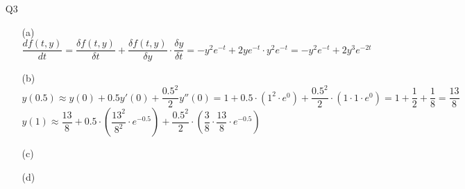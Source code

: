 \documentclass{article}
\begin{document}
\begin{itemize}
\begin{itemize}
\begin{verbatim}
    for h in h_vals:
        print(f"h={h}")
        t, y, steps = t_0, y_0, int((t_f-t_0)/h)
        for _ in range(steps):
            y_prev = y
            y = y_prev + h*(1+t)/(1+y_prev)
            t += h
        print(f"y={y}\n")
                    \end{verbatim}
              \item [(c)] Exact solution: $y(2)=\sqrt{14}-1\approx 2.741657387$; we can see that smaller $h$ values resulted in approximations that are closer to the exact $y(2)$ value as expected.
          \end{itemize}
    \item [Q3]
          \begin{itemize}
              \item [(a)] $\dfrac{df(t,y)}{dt}=\dfrac{\delta f(t,y)}{\delta t}+\dfrac{\delta f(t,y)}{\delta y}\cdot\dfrac{\delta y}{\delta t}=-y^2e^{-t}+2ye^{-t}\cdot y^2e^{-t}=\boxed{-y^2e^{-t}+2y^3e^{-2t}}$
              \item [(b)] $y(0.5)\approx y(0)+0.5y'(0)+\dfrac{0.5^2}{2}y''(0)=1+0.5\cdot(1^2\cdot e^0)+\dfrac{0.5^2}{2}\cdot(1\cdot 1\cdot e^0)=1+\dfrac{1}{2}+\dfrac{1}{8}=\dfrac{13}{8}$\\$y(1)\approx \dfrac{13}{8}+0.5\cdot(\dfrac{13^2}{8^2}\cdot e^{-0.5})+\dfrac{0.5^2}{2}\cdot(\dfrac{3}{8}\cdot\dfrac{13}{8}\cdot e^{-0.5})$
              \item [(c)]
              \item [(d)]
          \end{itemize}
\end{itemize}
\end{document}
